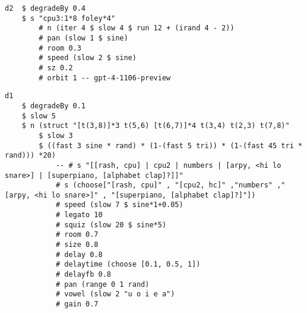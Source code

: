\begin{minipage}[t]{1\textwidth}
    \centering
    \begin{lstlisting}[style=SuperCollider-IDE, language=ExtendedHaskell, basicstyle=\footnotesize\ttfamily, numbers=none]
d2  $ degradeBy 0.4 
    $ s "cpu3:1*8 foley*4" 
        # n (iter 4 $ slow 4 $ run 12 + (irand 4 - 2)) 
        # pan (slow 1 $ sine) 
        # room 0.3 
        # speed (slow 2 $ sine) 
        # sz 0.2 
        # orbit 1 -- gpt-4-1106-preview                  
    \end{lstlisting}
    \vspace{1cm}
\end{minipage}








\begin{minipage}[t]{1\textwidth}
    \centering
    \begin{lstlisting}[style=SuperCollider-IDE, language=ExtendedHaskell, basicstyle=\footnotesize\ttfamily, numbers=none]
d1 
    $ degradeBy 0.1
    $ slow 5 
    $ n (struct "[t(3,8)]*3 t(5,6) [t(6,7)]*4 t(3,4) t(2,3) t(7,8)"
        $ slow 3 
        $ ((fast 3 sine * rand) * (1-(fast 5 tri)) * (1-(fast 45 tri * rand))) *20) 
            -- # s "[[rash, cpu] | cpu2 | numbers | [arpy, <hi lo snare>] | [superpiano, [alphabet clap]?]]" 
            # s (choose["[rash, cpu]" , "[cpu2, hc]" ,"numbers" ," [arpy, <hi lo snare>]" , "[superpiano, [alphabet clap]?]"])
            # speed (slow 7 $ sine*1+0.05) 
            # legato 10
            # squiz (slow 20 $ sine*5)
            # room 0.7
            # size 0.8
            # delay 0.8
            # delaytime (choose [0.1, 0.5, 1])
            # delayfb 0.8
            # pan (range 0 1 rand)
            # vowel (slow 2 "u o i e a")
            # gain 0.7               
    \end{lstlisting}
    \vspace{1cm}
\end{minipage}






